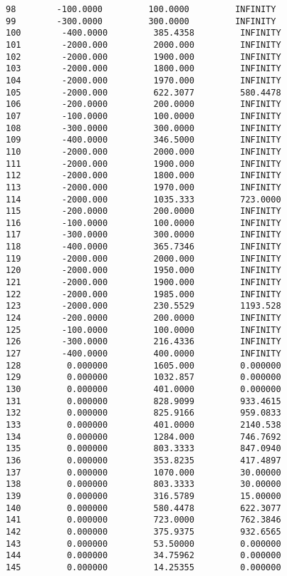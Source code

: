 \documentclass[12pt]{article}
\begin{document}
\begin{appendices}
\begin{lstlisting}
98        -100.0000         100.0000         INFINITY
99        -300.0000         300.0000         INFINITY
100        -400.0000         385.4358         INFINITY
101        -2000.000         2000.000         INFINITY
102        -2000.000         1900.000         INFINITY
103        -2000.000         1800.000         INFINITY
104        -2000.000         1970.000         INFINITY
105        -2000.000         622.3077         580.4478
106        -200.0000         200.0000         INFINITY
107        -100.0000         100.0000         INFINITY
108        -300.0000         300.0000         INFINITY
109        -400.0000         346.5000         INFINITY
110        -2000.000         2000.000         INFINITY
111        -2000.000         1900.000         INFINITY
112        -2000.000         1800.000         INFINITY
113        -2000.000         1970.000         INFINITY
114        -2000.000         1035.333         723.0000
115        -200.0000         200.0000         INFINITY
116        -100.0000         100.0000         INFINITY
117        -300.0000         300.0000         INFINITY
118        -400.0000         365.7346         INFINITY
119        -2000.000         2000.000         INFINITY
120        -2000.000         1950.000         INFINITY
121        -2000.000         1900.000         INFINITY
122        -2000.000         1985.000         INFINITY
123        -2000.000         230.5529         1193.528
124        -200.0000         200.0000         INFINITY
125        -100.0000         100.0000         INFINITY
126        -300.0000         216.4336         INFINITY
127        -400.0000         400.0000         INFINITY
128         0.000000         1605.000         0.000000
129         0.000000         1032.857         0.000000
130         0.000000         401.0000         0.000000
131         0.000000         828.9099         933.4615
132         0.000000         825.9166         959.0833
133         0.000000         401.0000         2140.538
134         0.000000         1284.000         746.7692
135         0.000000         803.3333         847.0940
136         0.000000         353.8235         417.4897
137         0.000000         1070.000         30.00000
138         0.000000         803.3333         30.00000
139         0.000000         316.5789         15.00000
140         0.000000         580.4478         622.3077
141         0.000000         723.0000         762.3846
142         0.000000         375.9375         932.6565
143         0.000000         53.50000         0.000000
144         0.000000         34.75962         0.000000
145         0.000000         14.25355         0.000000

\end{lstlisting}
\end{appendices}
\end{document}
